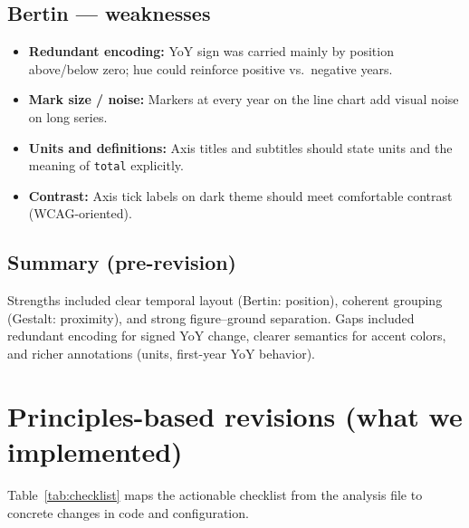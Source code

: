 \documentclass[11pt,a4paper]{article}
\begin{document}
\subsection{Bertin --- weaknesses}
\begin{itemize}[leftmargin=*]
  \item \textbf{Redundant encoding:} YoY sign was carried mainly by position above/below zero; hue could reinforce positive vs.\ negative years.
  \item \textbf{Mark size / noise:} Markers at every year on the line chart add visual noise on long series.
  \item \textbf{Units and definitions:} Axis titles and subtitles should state units and the meaning of \texttt{total} explicitly.
  \item \textbf{Contrast:} Axis tick labels on dark theme should meet comfortable contrast (WCAG-oriented).
\end{itemize}

\subsection{Summary (pre-revision)}
Strengths included clear temporal layout (Bertin: position), coherent grouping (Gestalt: proximity), and strong figure--ground separation. Gaps included redundant encoding for signed YoY change, clearer semantics for accent colors, and richer annotations (units, first-year YoY behavior).

\section{Principles-based revisions (what we implemented)}
\label{sec:revision}

Table~\ref{tab:checklist} maps the actionable checklist from the analysis file to concrete changes in code and configuration.
\end{document}
